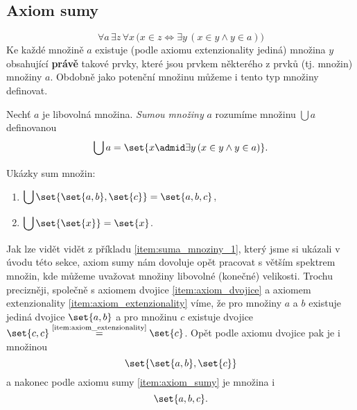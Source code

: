 \subsection{Axiom sumy}
\begin{equation*}
    \forall a\,\exists z\,\forall x\,\big(x\in z\iff \exists y\,(x\in y \land y\in a)\big)
\end{equation*}
Ke každé množině $a$ existuje (podle axiomu extenzionality jediná) množina $y$ obsahující \textbf{právě} takové prvky, které jsou prvkem některého z prvků (tj. množin) množiny $a$. Obdobně jako potenční množinu můžeme i tento typ množiny definovat.
\begin{definition}
    Nechť $a$ je libovolná množina. \emph{Sumou množiny} $a$ rozumíme množinu $\bigcup a$ definovanou
    \begin{equation*}
        \bigcup a=\set{x \admid \exists y\,(x\in y \land y\in a)}.
    \end{equation*}
\end{definition}
\begin{example}\label{ex:sumy_mnozin}
    Ukázky sum množin:
    \begin{enumerate}[label=(\roman*)]
        \item\label{item:suma_mnoziny_1} $\displaystyle\bigcup\set{\set{a,b},\set{c}}=\set{a,b,c}$,
        \item\label{item:suma_mnoziny_2} $\displaystyle\bigcup\set{\set{x}}=\set{x}$.
    \end{enumerate}
\end{example}
Jak lze vidět vidět z příkladu \ref{item:suma_mnoziny_1}, který jsme si ukázali v úvodu této sekce, axiom sumy nám dovoluje opět pracovat s větším spektrem množin, kde můžeme uvažovat množiny libovolné (konečné) velikosti. Trochu precizněji, společně s axiomem dvojice \ref{item:axiom_dvojice} a axiomem extenzionality \ref{item:axiom_extenzionality} víme, že pro množiny $a$ a $b$ existuje jediná dvojice $\set{a,b}$ a pro množinu $c$ existuje dvojice $\set{c,c}\stackrel{\text{\ref{item:axiom_extenzionality}}}{=}\set{c}$. Opět podle axiomu dvojice pak je i množinou
\begin{equation*}
    \set{\set{a,b},\set{c}}
\end{equation*}
a nakonec podle axiomu sumy \ref{item:axiom_sumy} je množina i
\begin{equation*}
    \set{a,b,c}.
\end{equation*}
\medskip

